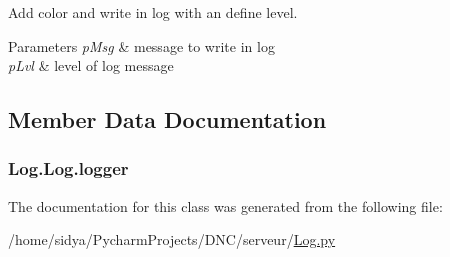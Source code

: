 Add color and write in log with an define level. 


\begin{DoxyParams}{Parameters}
{\em p\+Msg} & message to write in log \\
\hline
{\em p\+Lvl} & level of log message \\
\hline
\end{DoxyParams}


\subsection{Member Data Documentation}
\hypertarget{class_log_1_1_log_a0389e51ebd116d483b2b8e662bbcdf09}{}
\subsubsection[{logger}]{\setlength{\rightskip}{0pt plus 5cm}Log.\+Log.\+logger}\label{class_log_1_1_log_a0389e51ebd116d483b2b8e662bbcdf09}


The documentation for this class was generated from the following file\+:\begin{DoxyCompactItemize}
\item 
/home/sidya/\+Pycharm\+Projects/\+D\+N\+C/serveur/\hyperlink{_log_8py}{Log.\+py}\end{DoxyCompactItemize}
